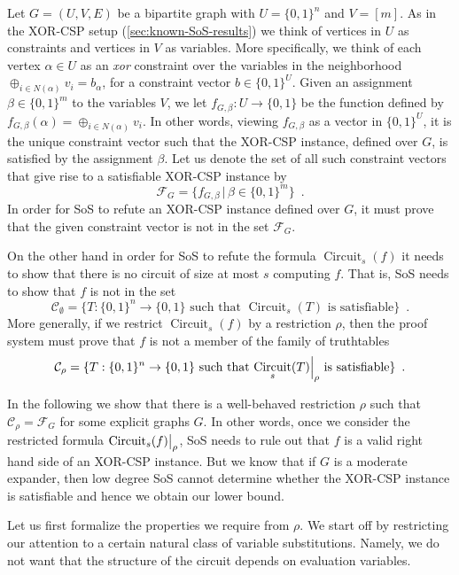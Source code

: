 \documentclass[10pt,a4paper]{article}
\theoremstyle{plain}
\theoremstyle{remark}
\theoremstyle{definition}
\newcommand{\eqperiod}{\enspace .}
\newcommand{\set}[1]{\{#1\}}
\newcommand\restrict[2]{{%
  \left.\kern-\nulldelimiterspace %
  #1 %
  \vphantom{\big|} %
  \right|_{#2} %
  }}
\newcommand{\calC}{\mathcal{C}}
\newcommand{\calF}{\mathcal{F}}
\DeclareMathOperator{\circuit}{Circuit}
\begin{document}
Let $G=(U, V, E)$ be a bipartite graph with $U = \set{0,1}^n$ and
$V = [m]$. As in the XOR-CSP setup (\cref{sec:known-SoS-results}) we
think of vertices in $U$ as constraints and vertices in $V$ as
variables. More specifically, we think of each vertex $\alpha \in U$
as an \emph{xor} constraint over the variables in the neighborhood
$\oplus_{i \in N(\alpha)} v_i = b_\alpha$, for a constraint vector
$b \in \set{0,1}^U$. Given an assignment $\beta \in \set{0,1}^m$ to
the variables $V$, we let $f_{G, \beta}: U \rightarrow \set{0,1}$ be
the function defined by
$f_{G, \beta}(\alpha) = \oplus_{i \in N(\alpha)} v_i$.  In other
words, viewing $f_{G,\beta}$ as a vector in $\set{0,1}^U$, it is the
unique constraint vector such that the XOR-CSP instance, defined over
$G$, is satisfied by the assignment $\beta$. Let us denote the set of
all such constraint vectors that give rise to a satisfiable XOR-CSP
instance by
\[
  \calF_G = \set{f_{G, \beta} \,|\, \beta \in \set{0,1}^m} \eqperiod
\]
In order for SoS to refute an XOR-CSP instance defined over $G$,
it must prove that the given constraint vector is not in the set
$\calF_G$.

On the other hand in order for SoS to refute the formula $\circuit_s(f)$
it needs to show that there is no circuit of size at most $s$
computing $f$. That is, SoS needs to show that $f$ is not in the set
\[
  \calC_{\emptyset} =
  \set{
    T:
    \set{0,1}^n \rightarrow \set{0,1}
    \text{~such that~}
    \circuit_s(T)
    \text{~is satisfiable}
  } \eqperiod
\]
More generally, if we restrict $\circuit_s(f)$ by a restriction
$\rho$, then the proof system must prove that $f$ is not a member
of the family of truthtables
\[
  \calC_\rho =
  \set{
    T:
    \set{0,1}^n \rightarrow \set{0,1}
    \text{~such that~}
    \restrict{\circuit_s(T)}{\rho}
    \text{~is satisfiable}
  } \eqperiod
\]

In the following we show that there is a well-behaved restriction
$\rho$ such that $\calC_\rho = \calF_G$ for some explicit graphs
$G$. In other words, once we consider the restricted formula
$\restrict{\circuit_s(f)}{\rho}$, SoS needs to rule
out that $f$ is a valid right hand side of an XOR-CSP instance. But we
know that if $G$ is a moderate expander, then low degree SoS cannot
determine whether the XOR-CSP instance is satisfiable and hence we
obtain our lower bound.

Let us first formalize the properties we require from $\rho$. We start
off by restricting our attention to a certain natural class of variable
substitutions. Namely, we do not want that the structure of the circuit
depends on evaluation variables.
\end{document}
